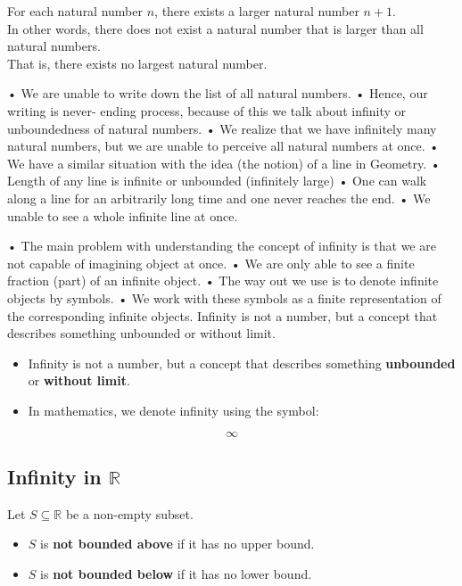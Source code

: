 \documentclass[
]{book}
\providecommand{\tightlist}{%
  \setlength{\itemsep}{0pt}\setlength{\parskip}{0pt}}
\theoremstyle{definition}
\theoremstyle{definition}
\theoremstyle{definition}
\theoremstyle{definition}
\theoremstyle{remark}
\begin{document}
For each natural number \(n\), there exists a larger natural number \(n + 1\).\\
In other words, there does not exist a natural number that is larger than all natural numbers.\\
That is, there exists no largest natural number.

• We are unable to write down the list of all natural
numbers.
• Hence, our writing is never- ending process,
because of this we talk about infinity or
unboundedness of natural numbers.
• We realize that we have infinitely many natural
numbers, but we are unable to perceive all natural
numbers at once.
• We have a similar situation with the idea (the notion)
of a line in Geometry.
• Length of any line is infinite or unbounded
(infinitely large)
• One can walk along a line for an arbitrarily long
time and one never reaches the end.
• We unable to see a whole infinite line at once.

• The main problem with understanding the concept of
infinity is that we are not capable of imagining object
at once.
• We are only able to see a finite fraction (part) of
an infinite object.
• The way out we use is to denote infinite objects
by symbols.
• We work with these symbols as a finite
representation of the corresponding infinite
objects.
Infinity is not a number, but a concept that describes something unbounded or without limit.

\begin{itemize}
\item
  Infinity is not a number, but a concept that describes something \textbf{unbounded} or \textbf{without limit}.
\item
  In mathematics, we denote infinity using the symbol:
\end{itemize}

\[
\infty
\]

\subsection{\texorpdfstring{\textbf{Infinity in \(\mathbb{R}\)}}{Infinity in \textbackslash mathbb\{R\}}}\label{infinity-in-mathbbr}

Let \(S \subseteq \mathbb{R}\) be a non-empty subset.

\begin{itemize}
\tightlist
\item
  \(S\) is \textbf{not bounded above} if it has no upper bound.
\item
  \(S\) is \textbf{not bounded below} if it has no lower bound.
\end{itemize}
\end{document}
